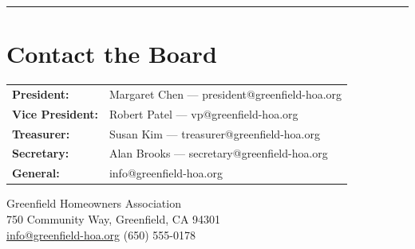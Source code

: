 \documentclass[
    language=english,
    doctype=newsletter,
    institution=none,
]{../../omnilatex}
\begin{document}
\vspace{0.5em}
\noindent\rule{\textwidth}{0.4pt}
\vspace{0.5em}

\section*{Contact the Board}

\begin{tabular}{ll}
    \textbf{President:}      & Margaret Chen --- president@greenfield-hoa.org \\
    \textbf{Vice President:}  & Robert Patel --- vp@greenfield-hoa.org \\
    \textbf{Treasurer:}       & Susan Kim --- treasurer@greenfield-hoa.org \\
    \textbf{Secretary:}       & Alan Brooks --- secretary@greenfield-hoa.org \\
    \textbf{General:}         & info@greenfield-hoa.org \\
\end{tabular}

\vspace{0.5em}

\begin{center}
    {\small Greenfield Homeowners Association \\
    750 Community Way, Greenfield, CA 94301 \\
    \href{mailto:info@greenfield-hoa.org}{info@greenfield-hoa.org} \hfill
    (650) 555-0178}
\end{center}
\end{document}
